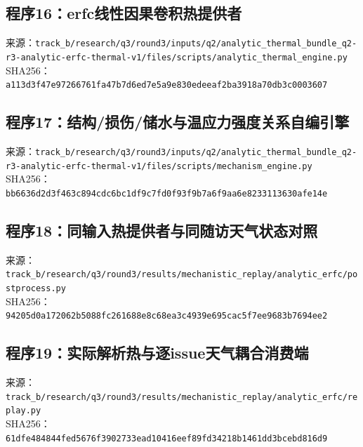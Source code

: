 \subsection*{程序16：erfc线性因果卷积热提供者}
\noindent 来源：\nolinkurl{track_b/research/q3/round3/inputs/q2/analytic_thermal_bundle_q2-r3-analytic-erfc-thermal-v1/files/scripts/analytic_thermal_engine.py}\\
\noindent SHA256：\texttt{a113d3f47e97266761fa47b7d6ed7e5a}\allowbreak\texttt{9e830edeeaf2ba3918a70db3c0003607}\\
\clearpage
\subsection*{程序17：结构/损伤/储水与温应力强度关系自编引擎}
\noindent 来源：\nolinkurl{track_b/research/q3/round3/inputs/q2/analytic_thermal_bundle_q2-r3-analytic-erfc-thermal-v1/files/scripts/mechanism_engine.py}\\
\noindent SHA256：\texttt{bb6636d2d3f463c894cdc6bc1df9c7fd}\allowbreak\texttt{0f93f9b7a6f9aa6e8233113630afe14e}\\
\clearpage
\subsection*{程序18：同输入热提供者与同随访天气状态对照}
\noindent 来源：\nolinkurl{track_b/research/q3/round3/results/mechanistic_replay/analytic_erfc/postprocess.py}\\
\noindent SHA256：\texttt{94205d0a172062b5088fc261688e8c68}\allowbreak\texttt{ea3c4939e695cac5f7ee9683b7694ee2}\\
\clearpage
\subsection*{程序19：实际解析热与逐issue天气耦合消费端}
\noindent 来源：\nolinkurl{track_b/research/q3/round3/results/mechanistic_replay/analytic_erfc/replay.py}\\
\noindent SHA256：\texttt{61dfe484844fed5676f3902733ead104}\allowbreak\texttt{16eef89fd34218b1461dd3bcebd816d9}\\
\clearpage
